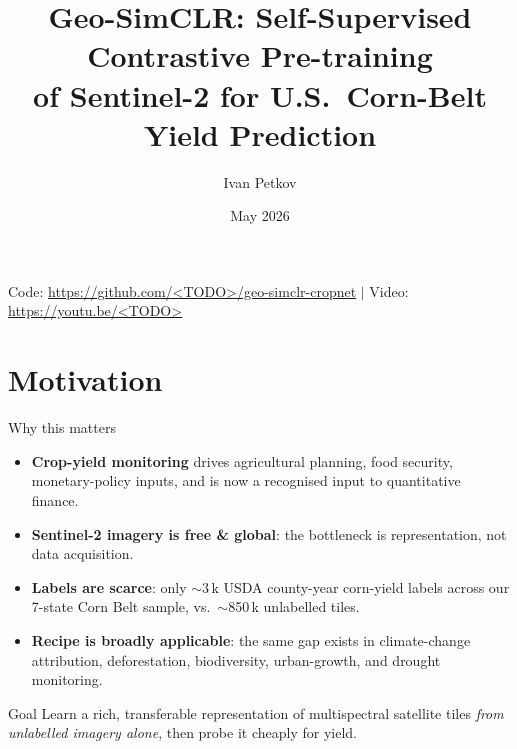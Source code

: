\documentclass[aspectratio=169,11pt]{beamer}
\title[Geo-SimCLR]{Geo-SimCLR: Self-Supervised Contrastive Pre-training\\
                   of Sentinel-2 for U.S.\ Corn-Belt Yield Prediction}
\author[Ivan Petkov]{Ivan Petkov}
\institute[Yale]{%
  AMTH 5520 -- Final Project\\
  Yale University\\
  \vspace{2pt}
  \footnotesize Instructor: Prof.\ Smita Krishnaswamy
}
\date{May 2026}
\begin{document}

\begin{frame}[plain]
  \titlepage
  \vfill
  \centering\scriptsize
  Code: \url{https://github.com/<TODO>/geo-simclr-cropnet}
  \quad$|$\quad
  Video: \url{https://youtu.be/<TODO>}
\end{frame}

\section{Motivation}
\begin{frame}{Why this matters}
  \begin{itemize}\setlength\itemsep{6pt}
    \item \textbf{Crop-yield monitoring} drives agricultural planning, food
          security, monetary-policy inputs, and is now a recognised input to
          quantitative finance.
    \item \textbf{Sentinel-2 imagery is free \& global}: the bottleneck is
          \alert{representation}, not data acquisition.
    \item \textbf{Labels are scarce}: only $\sim$3\,k USDA county-year corn-yield
          labels across our 7-state Corn Belt sample, vs.\ $\sim$850\,k
          unlabelled tiles.
    \item \textbf{Recipe is broadly applicable}: the same gap exists in
          climate-change attribution, deforestation, biodiversity, urban-growth,
          and drought monitoring.
  \end{itemize}

  \vspace{6pt}
  \begin{block}{Goal}
    Learn a rich, transferable representation of multispectral satellite tiles
    \emph{from unlabelled imagery alone}, then probe it cheaply for yield.
  \end{block}
\end{frame}

\end{document}
